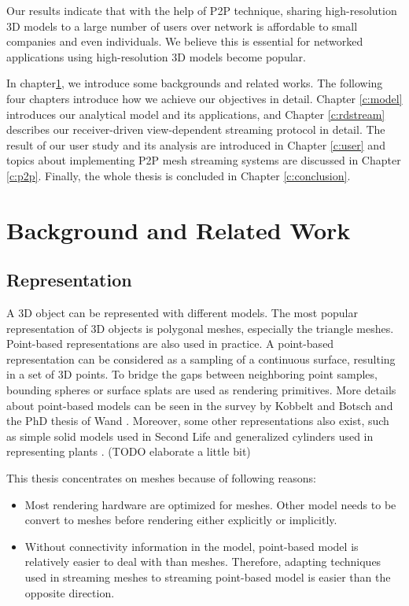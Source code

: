     Our results indicate that with the help of P2P technique,
    sharing high-resolution
    3D models to a large number of users over network is affordable
    to small companies and even individuals. We believe this is
    essential for networked applications using high-resolution 3D models
    become popular.

    In chapter\ref{c:related}, we introduce some backgrounds and related works.
    The following four chapters introduce how we achieve our objectives in detail.
    Chapter \ref{c:model} introduces our analytical model and its applications, and
    Chapter \ref{c:rdstream} describes our receiver-driven view-dependent streaming
    protocol in detail. The result of our user study and its analysis are introduced
    in Chapter \ref{c:user} and topics about implementing P2P mesh streaming systems
    are discussed in Chapter \ref{c:p2p}. Finally, the whole thesis is concluded in
    Chapter \ref{c:conclusion}.

\chapter{Background and Related Work}
\label{c:related}
    \section{Representation}
    \label{s:related:representation}
    A 3D object can be represented with different models.
    The most popular representation of 3D objects is polygonal meshes, 
    especially the triangle meshes.
    Point-based representations are also used in practice.
    A point-based representation can be considered as a 
    sampling of a continuous surface, resulting in a set of 3D points. 
    To bridge the gaps between neighboring point samples, 
    bounding spheres \cite{rusinkiewicz:qsplat, 364350} or surface splats \cite{383300} are used as rendering primitives. 
    More details about point-based models can be seen in the survey by Kobbelt and Botsch \cite{DBLP:journals/cg/KobbeltB04} 
    and the PhD thesis of Wand \cite{wand:point}.  
    Moreover, some other representations also exist, such as simple solid models used in Second Life
    and generalized cylinders used in representing plants \cite{plant:seb, compact:mondet}.
    (TODO elaborate a little bit)

    This thesis concentrates on meshes because of following reasons:
    \begin{itemize}
        \item Most rendering hardware are optimized for meshes. Other model needs to be convert
            to meshes before rendering either explicitly or implicitly. 
        \item Without connectivity information in the model, point-based model is relatively easier to deal with
            than meshes. Therefore, adapting techniques used in streaming meshes to streaming point-based model
            is easier than the opposite direction.
    \end{itemize}
    
